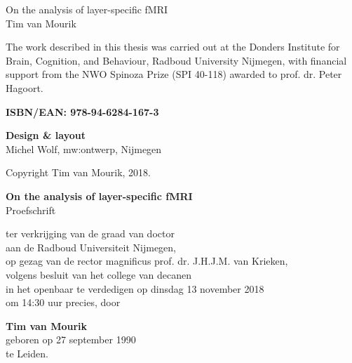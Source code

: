 \thispagestyle{empty}

{\setlength{\parindent}{0cm}
	\begin{flushright}
		\vspace{120pt}
		\huge{On the analysis of layer-specific fMRI}\\
		\vspace{80pt}
		\large{Tim van Mourik}
	\end{flushright}
}

\newpage

\thispagestyle{empty}
{\setlength{\parindent}{0cm}\raggedright\smaller
\null\vfill

The work described in this thesis was carried out at the Donders Institute for Brain, Cognition, and Behaviour, Radboud University Nijmegen, with financial support from the NWO Spinoza Prize (SPI 40-118) awarded to prof. dr. Peter Hagoort.

\vspace{12pt}

\textbf{ISBN/EAN: 978-94-6284-167-3}

\vspace{12pt}
\textbf{Design \& layout}\\
Michel Wolf, mw:ontwerp, Nijmegen

\vspace{12pt}
Copyright {\textcopyright} Tim van Mourik, 2018. 
}

\newpage

\thispagestyle{empty}
\begin{minipage}[c]{100mm}

\begin{center}
\vspace{20pt}
\large{\textbf{On the analysis of layer-specific fMRI}}\\
\vspace{70pt}
\large{Proefschrift}\\
\vspace{60pt}

{
ter verkrijging van de graad van doctor \\ 
aan de Radboud Universiteit Nijmegen, \\
op gezag van de rector magnificus prof. dr. J.H.J.M. van Krieken, \\
volgens besluit van het college van decanen\\ 
in het openbaar te verdedigen op dinsdag 13 november 2018\\ 
om 14:30 uur precies,
}
\vspace{30pt}
door
\vspace{30pt}

{\textbf{Tim van Mourik}}\\
geboren op 27 september 1990\\
te Leiden.
\end{center}

\end{minipage}
%
\newpage
\thispagestyle{empty}

